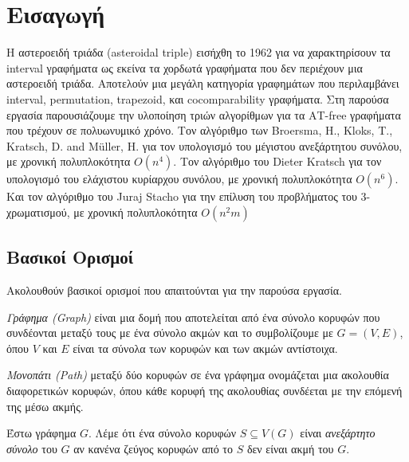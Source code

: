 \chapter{Εισαγωγή}
\label{ch:Introduction}

Η αστεροειδή τριάδα (asteroidal triple) εισήχθη το 1962 για να χαρακτηρίσουν τα interval γραφήματα ως εκείνα τα χορδωτά γραφήματα που δεν περιέχουν μια αστεροειδή τριάδα\cite{ref-20-independent-sets}. Αποτελούν μια μεγάλη κατηγορία γραφημάτων που περιλαμβάνει interval, permutation, trapezoid, και cocomparability γραφήματα.
Στη παρούσα εργασία παρουσιάζουμε την υλοποίηση τριών αλγορίθμων για τα ΑΤ-free γραφήματα που τρέχουν σε πολυωνυμικό χρόνο. Τον αλγόριθμο των Broersma, H., Kloks, T., Kratsch, D. and Müller, H.\cite{at-free-independent-sets} για τον υπολογισμό του μέγιστου ανεξάρτητου συνόλου, με χρονική πολυπλοκότητα $O(n^4)$. Τον αλγόριθμο του Dieter Kratsch\cite{at-free-domination} για τον υπολογισμό του ελάχιστου κυρίαρχου συνόλου, με χρονική πολυπλοκότητα $O(n^6)$. Και τον αλγόριθμο του Juraj Stacho\cite{at-free-3-colouring} για την επίλυση του προβλήματος του 3-χρωματισμού, με χρονική πολυπλοκότητα $O(n^2m)$

\section{Βασικοί Ορισμοί}
\label{sec:Definitions}

Ακολουθούν βασικοί ορισμοί που απαιτούνται για την παρούσα εργασία.

\begin{definition}
	\textit{Γράφημα (Graph)} είναι μια δομή που αποτελείται από ένα σύνολο κορυφών που συνδέονται μεταξύ τους με ένα σύνολο ακμών και το συμβολίζουμε με $G =(V,E)$, όπου $V$ και $E$ είναι τα σύνολα των κορυφών και των ακμών αντίστοιχα. 
\end{definition}


\begin{definition}
	\textit{Μονοπάτι (Path)} μεταξύ δύο κορυφών σε ένα γράφημα ονομάζεται μια ακολουθία διαφορετικών κορυφών, όπου κάθε κορυφή της ακολουθίας συνδέεται με την επόμενή της μέσω ακμής.
\end{definition}

\begin{definition}
	Έστω γράφημα $G$. Λέμε ότι ένα σύνολο κορυφών $S \subseteq V(G)$ είναι \textit{ανεξάρτητο σύνολο} του $G$ αν κανένα ζεύγος κορυφών από το $S$ δεν είναι ακμή του $G$. 
\end{definition}

